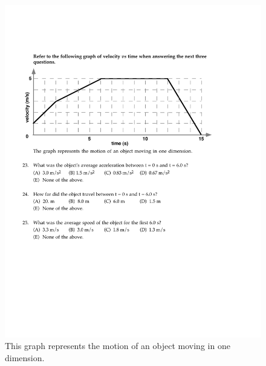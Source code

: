 \documentclass[10pt]{article}
\begin{document}

\begin{figure}[h!]
	\begin{center}
        \includegraphics[width=1.0\textwidth]{v_graph.pdf}
        \caption{This graph represents the motion of an object moving in one dimension.
        }
        \label{fig:v}
	\end{center}
        \end{figure}
\end{document}
